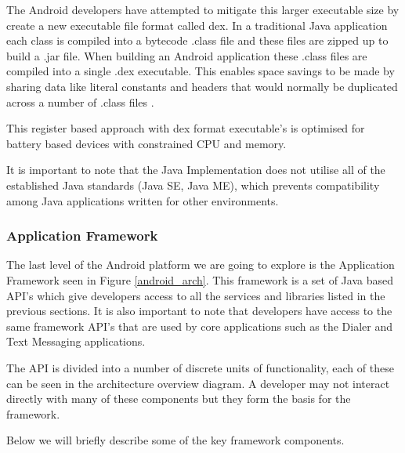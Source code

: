 The Android developers have attempted to mitigate this larger executable size by create a new executable file format called dex. In a traditional Java application each class is compiled into a bytecode .class file and these files are zipped up to build a .jar file. When building an Android application these .class files are compiled into a single .dex executable. This enables space savings to be made by sharing data like literal constants and headers that would normally be duplicated across a number of .class files \cite{ehringerdalvik10}.

This register based approach with dex format executable’s is optimised for battery based devices with constrained CPU and memory. 

It is important to note that the Java Implementation does not utilise all of the established Java standards (Java SE, Java ME), which prevents compatibility among Java applications written for other environments.

\subsubsection{Application Framework}
The last level of the Android platform we are going to explore is the Application Framework seen in Figure \ref{android_arch}. This framework is a set of Java based API’s which give developers access to all the services and libraries listed in the previous sections. It is also important to note that developers have access to the same framework API’s that are used by core applications such as the Dialer and Text Messaging applications.

The API is divided into a number of discrete units of functionality, each of these can be seen in the architecture overview diagram. A developer may not interact directly with many of these components but they form the basis for the framework.

Below we will briefly describe some of the key framework components.

